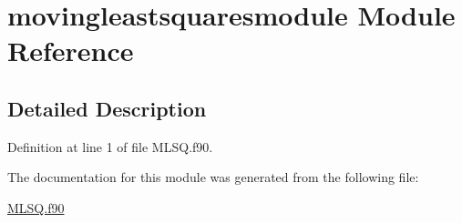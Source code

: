 \hypertarget{classmovingleastsquaresmodule}{\section{movingleastsquaresmodule Module Reference}
\label{classmovingleastsquaresmodule}
}


\subsection{Detailed Description}


Definition at line 1 of file M\+L\+S\+Q.\+f90.



The documentation for this module was generated from the following file\+:\begin{DoxyCompactItemize}
\item 
\hyperlink{MLSQ_8f90}{M\+L\+S\+Q.\+f90}\end{DoxyCompactItemize}
